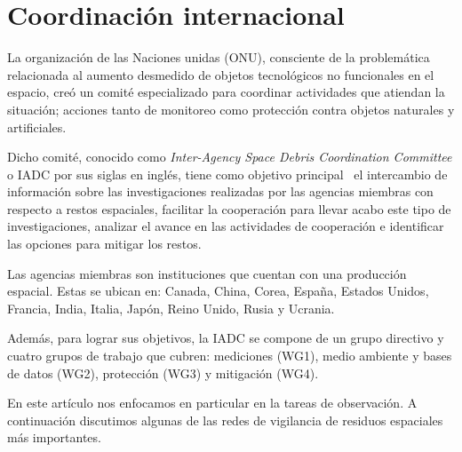 \section{Coordinación internacional} \label{sec:coordinacion}

La organización de las Naciones unidas (ONU), consciente de la problemática relacionada al aumento desmedido de objetos tecnológicos no funcionales en el espacio, creó un comité especializado para coordinar actividades que atiendan la situación;
acciones tanto de monitoreo como protección contra objetos naturales y artificiales.

Dicho comité, conocido como  \textit{Inter-Agency Space Debris Coordination Committee} o IADC por sus siglas en inglés,
tiene como objetivo principal~\cite{iadc_doc} el intercambio de información sobre las investigaciones realizadas por las agencias miembras con respecto a restos espaciales,
facilitar la cooperación para llevar acabo este tipo de investigaciones, 
analizar el avance en las actividades de cooperación 
e identificar las opciones para mitigar los restos.

Las agencias miembras son instituciones que cuentan con una producción espacial. 
Estas se ubican en:  
Canada, China, Corea, España, Estados Unidos, Francia, India, Italia, Japón, Reino Unido, Rusia y Ucrania.

Además, para lograr sus objetivos,
la IADC se compone de un grupo directivo y cuatro grupos de trabajo que cubren:
mediciones (WG1),
medio ambiente y bases de datos (WG2),
protección (WG3) 
y
mitigación (WG4).

En este artículo nos enfocamos en particular en la tareas de observación. 
A continuación discutimos algunas de las redes de vigilancia de residuos espaciales más importantes.
